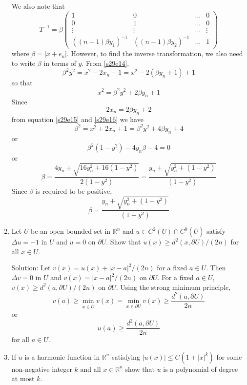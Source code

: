 \documentclass{article}
\theoremstyle{plain}
\numberwithin{thm}{section}
\theoremstyle{plain}
\numberwithin{prop}{section}
\theoremstyle{definition}
\numberwithin{defn}{section}
\theoremstyle{remark}
\numberwithin{equation}{section}
\begin{document}
\begin{enumerate}
We also note that
\[
T^{-1} = \beta \begin{pmatrix}
1 & 0 & \ldots & 0 \\
0 & 1 & \ldots & 0 \\
\vdots & \vdots & \ldots & \vdots \\
((n-1)\beta y_1)^{-1} & ((n-1)\beta y_2)^{-1} & \ldots &1 
\end{pmatrix}
\]
where $\beta = |x + e_n|$. However, to find the inverse transformation, we also need to write $\beta$ in terms of
$y$. From 
\eqref{s29e14},
\[
\beta^2 y^2 = x^2 - 2x_n + 1 = x^2 -2(\beta y_n + 1) + 1
\]
so that
\begin{equation}\label{s29e15}
x^2 = \beta^2 y^2 + 2\beta y_n + 1
\end{equation}
Since 
\begin{equation}\label{s29e16}
2x_n = 2\beta y_n + 2
\end{equation}
from equation \eqref{s29e15} and \eqref{s29e16} we have
\[
\beta^2 = x^2 + 2x_n + 1 =  \beta^2 y^2 + 4\beta y_n + 4
\]
or
\[
\beta^2(1 - y^2) -4y_n\beta - 4 = 0
\]
or
\[
\beta = \frac{4y_n \pm \sqrt{16y_n^2 + 16(1 - y^2)}}{2(1 - y^2)} = \frac{y_n \pm \sqrt{y_n^2+(1-y^2)}}{(1-y^2)}
\]
Since $\beta$ is required to be positive, 
\begin{equation}\label{s29e17}
\beta = \frac{y_n + \sqrt{y_n^2+(1-y^2)}}{(1-y^2)}
\end{equation}

\item Let $U$ be an open bounded set in $\mathbb{R}^n$ and $u \in C^2(U) \cap C^0(\bar{U})$ satisfy $\Delta u = -1$
in $U$ and $u = 0$ on $\partial U$. Show that $u(x) \ge d^2(x, \partial U)/(2n)$ for all $x \in U$.

Solution: Let $v(x) = u(x) + |x - a|^2/(2n)$ for a fixed $a \in U$. Then $\Delta v = 0$ in $U$ and $v(x) = 
|x - a|^2/(2n)$ on $\partial U$. For a fixed $a \in U$, $v(x) \ge d^2(a, \partial U)/(2n)$ on $\partial U$. Using
the strong minimum principle, 
\[
v(a) \ge \min_{x \in \bar{U}}v(x) = \min_{x \in \partial U}v(x) \ge \frac{d^2(a, \partial U)}{2n}
\]
or
\[
u(a) \ge \frac{d^2(a, \partial U)}{2n}
\]
for all $a \in U$.

\item If $u$ is a harmonic function in $\mathbb{R}^n$ satisfying $|u(x)| \le C(1 + |x|^k)$ for some non-negative
integer $k$ and all $x \in \mathbb{R}^n$ show that $u$ is a polynomial of degree at most $k$.


\end{enumerate}
\end{document}
